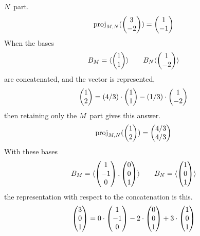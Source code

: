 \begin{exercises}
\begin{answer}
\begin{exparts}
           $N$~part.
           \begin{equation*}
             \proj{\colvec{3 \\ -2}}{M,N}
             =\colvec{1 \\ -1}
           \end{equation*}
         \partsitem When the bases
           \begin{equation*}
             B_M=\sequence{\colvec{1 \\ 1}}
             \qquad
             B_N\sequence{\colvec{1 \\ -2}}
           \end{equation*}
           are concatenated, and the vector is represented,
           \begin{equation*}
             \colvec{1 \\ 2}
               =(4/3)\cdot\colvec{1 \\ 1}
                -(1/3)\cdot\colvec{1 \\ -2}
           \end{equation*}
           then retaining only the $M$~part gives this answer.
           \begin{equation*}
             \proj{\colvec{1 \\ 2}}{M,N}=\colvec{4/3 \\ 4/3}
           \end{equation*}
         \partsitem With these bases
           \begin{equation*}
             B_M=\sequence{\colvec{1 \\ -1 \\ 0},
                           \colvec{0 \\ 0 \\ 1}}
             \qquad
             B_N=\sequence{\colvec{1 \\ 0 \\ 1}}
           \end{equation*}
           the representation with respect to the concatenation is this.
           \begin{equation*}
             \colvec{3 \\ 0 \\ 1}
               =0\cdot\colvec{1 \\ -1 \\ 0}
                -2\cdot\colvec{0 \\ 0 \\ 1}
                +3\cdot\colvec{1 \\ 0 \\ 1}

\end{equation*}
\end{exparts}
\end{answer}
\end{exercises}
